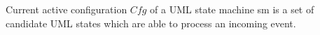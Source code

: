 \begin{definition} Current active configuration $Cfg$ of a UML state machine sm is a set of candidate UML states which are able to process an incoming event. 
\end{definition}





